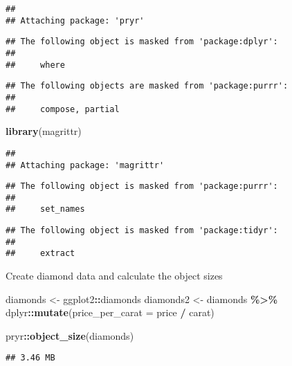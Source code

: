\documentclass[
]{article}
\newenvironment{Shaded}{\begin{snugshade}}{\end{snugshade}}
\newcommand{\AttributeTok}[1]{\textcolor[rgb]{0.13,0.29,0.53}{#1}}
\newcommand{\FunctionTok}[1]{\textcolor[rgb]{0.13,0.29,0.53}{\textbf{#1}}}
\newcommand{\NormalTok}[1]{#1}
\newcommand{\OtherTok}[1]{\textcolor[rgb]{0.56,0.35,0.01}{#1}}
\newcommand{\SpecialCharTok}[1]{\textcolor[rgb]{0.81,0.36,0.00}{\textbf{#1}}}
\begin{document}
\begin{verbatim}
## 
## Attaching package: 'pryr'
\end{verbatim}

\begin{verbatim}
## The following object is masked from 'package:dplyr':
## 
##     where
\end{verbatim}

\begin{verbatim}
## The following objects are masked from 'package:purrr':
## 
##     compose, partial
\end{verbatim}

\begin{Shaded}
\begin{Highlighting}[]
\FunctionTok{library}\NormalTok{(magrittr)}
\end{Highlighting}
\end{Shaded}

\begin{verbatim}
## 
## Attaching package: 'magrittr'
\end{verbatim}

\begin{verbatim}
## The following object is masked from 'package:purrr':
## 
##     set_names
\end{verbatim}

\begin{verbatim}
## The following object is masked from 'package:tidyr':
## 
##     extract
\end{verbatim}

Create diamond data and calculate the object sizes

\begin{Shaded}
\begin{Highlighting}[]
\NormalTok{diamonds }\OtherTok{\textless{}{-}}\NormalTok{ ggplot2}\SpecialCharTok{::}\NormalTok{diamonds}
\NormalTok{diamonds2 }\OtherTok{\textless{}{-}}\NormalTok{ diamonds }\SpecialCharTok{\%\textgreater{}\%} 
\NormalTok{  dplyr}\SpecialCharTok{::}\FunctionTok{mutate}\NormalTok{(}\AttributeTok{price\_per\_carat =}\NormalTok{ price }\SpecialCharTok{/}\NormalTok{ carat)}

\NormalTok{pryr}\SpecialCharTok{::}\FunctionTok{object\_size}\NormalTok{(diamonds)}
\end{Highlighting}
\end{Shaded}

\begin{verbatim}
## 3.46 MB
\end{verbatim}
\end{document}
